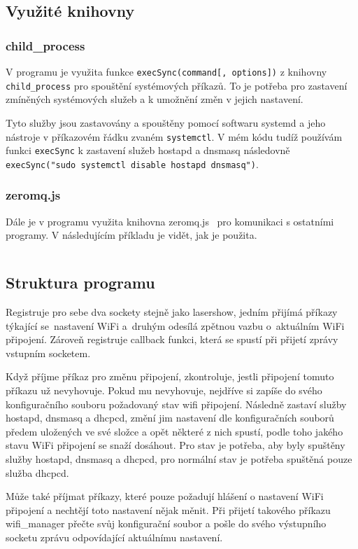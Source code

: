 \subsection{Využité knihovny}
\subsubsection{child\_process}
V programu je využita funkce \texttt{execSync(command[, options])} z knihovny \texttt{child_process} pro spouštění systémových příkazů. To je potřeba pro zastavení zmíněných systémových služeb a k umožnění změn v jejich nastavení.

Tyto služby jsou zastavovány a spouštěny pomocí softwaru systemd a jeho nástroje v příkazovém řádku zvaném \texttt{systemctl}.
V mém kódu tudíž používám funkci \texttt{execSync} k zastavení služeb hostapd a dnsmasq následovně \texttt{execSync("sudo systemctl disable hostapd dnsmasq")}.

\subsubsection{zeromq.js}
Dále je v programu využita knihovna zeromq.js~\cite{zeromq.js} pro komunikaci s ostatními programy. V následujícím příkladu je vidět, jak je použita.

\inputminted[frame=lines,fontsize=\footnotesize{}, linenos, breaklines]{js}{code_examples/zmq_server.js}

\subsection{Struktura programu}

Registruje pro sebe dva sockety stejně jako lasershow, jedním přijímá příkazy týkající se~nastavení WiFi a~druhým odesílá zpětnou vazbu o~aktuálním WiFi připojení. Zároveň registruje callback funkci, která se spustí při přijetí zprávy vstupním socketem.

Když příjme příkaz pro změnu připojení, zkontroluje, jestli připojení tomuto příkazu už nevyhovuje. Pokud mu nevyhovuje, nejdříve si zapíše do svého konfiguračního souboru požadovaný stav wifi připojení. Následně zastaví služby hostapd, dnsmasq a dhcpcd, změní jim nastavení dle konfiguračních souborů předem uložených ve své složce a opět některé z nich spustí, podle toho jakého stavu WiFi připojení se snaží dosáhout.
Pro  stav je potřeba, aby byly spuštěny služby hostapd, dnsmasq a dhcpcd, pro normální  stav je potřeba spuštěná pouze služba dhcpcd.

Může také příjmat příkazy, které pouze požadují hlášení o nastavení WiFi připojení a nechtějí toto nastavení nějak měnit. Při přijetí takového příkazu wifi\_manager přečte svůj konfigurační soubor a pošle do svého výstupního socketu zprávu odpovídající aktuálnímu nastavení.
